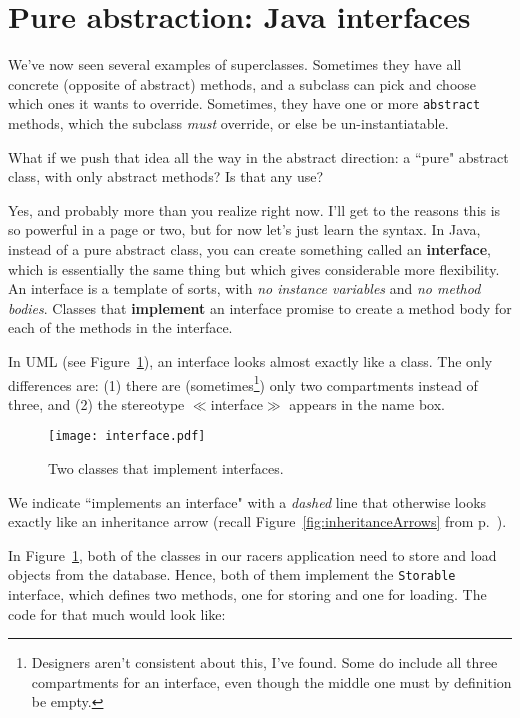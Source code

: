 \section{Pure abstraction: Java interfaces}

We've now seen several examples of superclasses. Sometimes they have all
concrete (opposite of abstract) methods, and a subclass can pick and choose
which ones it wants to override. Sometimes, they have one or more
\texttt{abstract} methods, which the subclass \textit{must} override, or else
be un-instantiatable.

What if we push that idea all the way in the abstract direction: a ``pure"
abstract class, with only abstract methods? Is that any use?

Yes, and probably more than you realize right now. I'll get to the reasons
this is so powerful in a page or two, but for now let's just learn the syntax.
In Java, instead of a pure abstract class, you can create something called an
\textbf{interface}, which is essentially the same thing but which gives
considerable more flexibility. An interface is a template of sorts, with
\textit{no instance variables} and \textit{no method bodies}. Classes that
\textbf{implement} an interface promise to create a method body for each of
the methods in the interface.

In UML (see Figure~\ref{fig:interface}), an interface looks almost exactly
like a class. The only differences are: (1) there are
(sometimes\footnote{Designers aren't consistent about this, I've found. Some
do include all three compartments for an interface, even though the middle one
must by definition be empty.}) only two compartments instead of three, and (2)
the stereotype $\ll$interface$\gg$ appears in the name box.

\begin{figure}[ht]
\centering
\texttt{[image: interface.pdf]}
\caption{Two classes that implement interfaces.}
\label{fig:interface}
\end{figure}

We indicate ``implements an interface" with a \textit{dashed} line that
otherwise looks exactly like an inheritance arrow (recall
Figure~\ref{fig:inheritanceArrows} from p.~\pageref{page:inheritanceArrows}).

In Figure~\ref{fig:interface}, both of the classes in our racers 
application need to store and load objects from the database. Hence, both of
them implement the \texttt{Storable} interface, which defines two methods, one
for storing and one for loading. The code for that much would look like:

